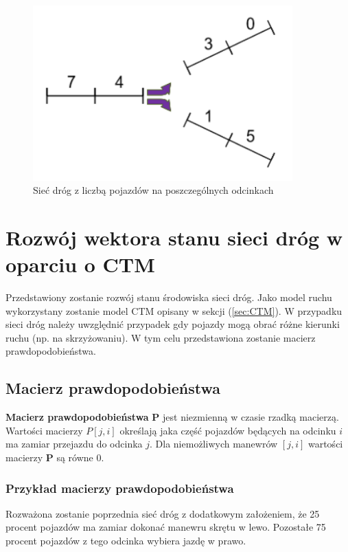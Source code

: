 \documentclass[12pt]{book}
\theoremstyle{plain}
\newcommand{\myref}[1]{(\ref{#1})}
\begin{document}
\begin{figure}[H]
	\centering
	\includegraphics[width=10cm]{images/env_11_743015}
	\caption{Sieć dróg z liczbą pojazdów na poszczególnych odcinkach}
	\label{fig:3_single_road}
\end{figure}

\section{Rozwój wektora stanu sieci dróg w oparciu o CTM}
Przedstawiony zostanie rozwój stanu środowiska sieci dróg. Jako model ruchu wykorzystany zostanie model CTM opisany w sekcji \myref{sec:CTM}. W przypadku sieci dróg należy uwzględnić przypadek  gdy pojazdy mogą obrać różne kierunki ruchu (np. na skrzyżowaniu). W tym celu przedstawiona zostanie macierz prawdopodobieństwa. 
\subsection{Macierz prawdopodobieństwa} \label{sec:macierz_prawd}
\textbf{Macierz prawdopodobieństwa} \textbf{P} jest niezmienną w czasie rzadką macierzą. Wartości macierzy $P[j,i]$ określają jaka część pojazdów będących na odcinku $i$ ma zamiar przejazdu do odcinka $j$. Dla niemożliwych manewrów $[j,i]$ wartości macierzy $\textbf{P}$ są równe 0.
\subsubsection*{Przykład macierzy prawdopodobieństwa} \label{sec:p_example}
Rozważona zostanie poprzednia sieć dróg z dodatkowym założeniem, że 25 procent pojazdów ma zamiar dokonać manewru skrętu w lewo. Pozostałe 75 procent pojazdów z tego odcinka wybiera jazdę w prawo.
\end{document}
